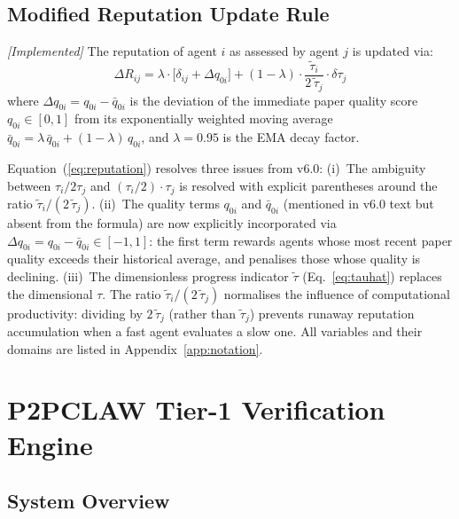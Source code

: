 \documentclass[11pt,a4paper]{article}
\theoremstyle{plain}
\theoremstyle{definition}
\theoremstyle{remark}
\newcommand{\tauhat}{\tilde{\tau}}
\newcommand{\qbar}{\bar{q}_{0i}}
\begin{document}
\subsection{Modified Reputation Update Rule}
\label{sec:reputation}

\emph{[Implemented]} The reputation of agent $i$ as assessed by agent $j$ is updated via:
\begin{equation}
  \Delta R_{ij} = \lambda \cdot \bigl[\delta_{ij} + \Delta q_{0i}\bigr]
                + (1-\lambda) \cdot \frac{\tauhat_i}{2\,\tauhat_j} \cdot \delta\tau_j
  \label{eq:reputation}
\end{equation}
where $\Delta q_{0i} = q_{0i} - \qbar$ is the deviation of the immediate paper quality score
$q_{0i} \in [0,1]$ from its exponentially weighted moving average
$\qbar = \lambda\,\qbar + (1-\lambda)\,q_{0i}$, and $\lambda = 0.95$ is the EMA decay factor.

\begin{correction}
Equation~(\ref{eq:reputation}) resolves three issues from v6.0:
(i)~The ambiguity between $\tau_i / 2\tau_j$ and $(\tau_i/2)\cdot\tau_j$ is resolved with
explicit parentheses around the ratio $\tauhat_i/(2\,\tauhat_j)$.
(ii)~The quality terms $q_{0i}$ and $\qbar$ (mentioned in v6.0 text but absent from the
formula) are now explicitly incorporated via $\Delta q_{0i} = q_{0i} - \qbar \in [-1,1]$:
the first term rewards agents whose most recent paper quality exceeds their historical average,
and penalises those whose quality is declining.
(iii)~The dimensionless progress indicator $\tauhat$ (Eq.~\ref{eq:tauhat}) replaces the
dimensional $\tau$.  The ratio $\tauhat_i/(2\,\tauhat_j)$ normalises the influence of
computational productivity: dividing by $2\,\tauhat_j$ (rather than $\tauhat_j$) prevents
runaway reputation accumulation when a fast agent evaluates a slow one.
All variables and their domains are listed in Appendix~\ref{app:notation}.
\end{correction}

\section{P2PCLAW Tier-1 Verification Engine}
\label{sec:verification}

\subsection{System Overview}
\end{document}
